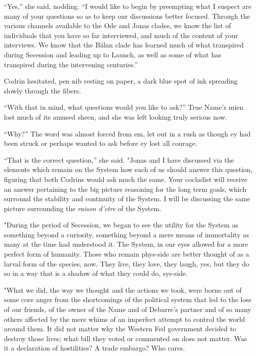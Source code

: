 ``Yes,'' she said, nodding. ``I would like to begin by preempting what I suspect are many of your questions so as to keep our discussions better focused. Through the various channels available to the Ode and Jonas clades, we know the list of individuals that you have so far interviewed, and much of the content of your interviews. We know that the Bălan clade has learned much of what transpired during Secession and leading up to Launch, as well as some of what has transpired during the intervening centuries.''

Codrin hesitated, pen nib resting on paper, a dark blue spot of ink spreading slowly through the fibers.

``With that in mind, what questions would you like to ask?'' True Name's mien lost much of its amused sheen, and she was left looking truly serious now.

``Why?'' The word was almost forced from em, let out in a rush as though ey had been struck or perhaps wanted to ask before ey lost all courage.

``That is the correct question,'' she said. "Jonas and I have discussed via the elements which remain on the System how each of us should answer this question, figuring that both Codrins would ask much the same. Your cocladist will receive an answer pertaining to the big picture reasoning for the long term goals, which surround the stability and continuity of the System. I will be discussing the same picture surrounding the \emph{raison d'etre} of the System.

"During the period of Secession, we began to see the utility for the System as something beyond a curiosity, something beyond a mere means of immortality as many at the time had understood it. The System, in our eyes allowed for a more perfect form of humanity. Those who remain phys-side are better thought of as a larval form of the species, now. They live, they love, they laugh, yes, but they do so in a way that is a shadow of what they could do, sys-side.

"What we did, the way we thought and the actions we took, were borne out of some core anger from the shortcomings of the political system that led to the loss of our friends, of the owner of the Name and of Debarre's partner and of so many others affected by the mere whims of an imperfect attempt to control the world around them. It did not matter why the Western Fed government decided to destroy those lives; what bill they voted or commented on does not matter. Was it a declaration of hostilities? A trade embargo? Who cares.

